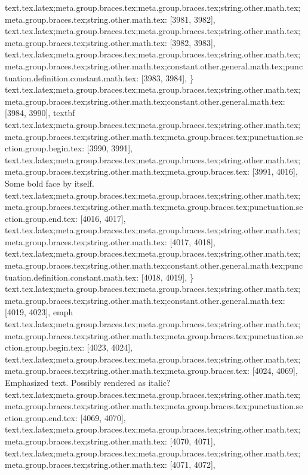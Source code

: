 {{{{{{{{{{{{{{{{{{{{{{{{{{{{{{{{{{{{{{{{{{{{{{{{{{{{{{{{{{{{{{{{{{{{{{{{{{{{{{{{{{{{{{{{{{{{{{{{{{{{{{{{{{{{{{{{{{{{{{{{{{{{{{text.tex.latex;meta.group.braces.tex;meta.group.braces.tex;string.other.math.tex;meta.group.braces.tex;string.other.math.tex: [3981, 3982], {
}
text.tex.latex;meta.group.braces.tex;meta.group.braces.tex;string.other.math.tex;meta.group.braces.tex;string.other.math.tex: [3982, 3983], {
}
text.tex.latex;meta.group.braces.tex;meta.group.braces.tex;string.other.math.tex;meta.group.braces.tex;string.other.math.tex;constant.other.general.math.tex;punctuation.definition.constant.math.tex: [3983, 3984], {\}
text.tex.latex;meta.group.braces.tex;meta.group.braces.tex;string.other.math.tex;meta.group.braces.tex;string.other.math.tex;constant.other.general.math.tex: [3984, 3990], {textbf}
text.tex.latex;meta.group.braces.tex;meta.group.braces.tex;string.other.math.tex;meta.group.braces.tex;string.other.math.tex;meta.group.braces.tex;punctuation.section.group.begin.tex: [3990, 3991], {{}
text.tex.latex;meta.group.braces.tex;meta.group.braces.tex;string.other.math.tex;meta.group.braces.tex;string.other.math.tex;meta.group.braces.tex: [3991, 4016], {Some bold face by itself.}
text.tex.latex;meta.group.braces.tex;meta.group.braces.tex;string.other.math.tex;meta.group.braces.tex;string.other.math.tex;meta.group.braces.tex;punctuation.section.group.end.tex: [4016, 4017], {}}
text.tex.latex;meta.group.braces.tex;meta.group.braces.tex;string.other.math.tex;meta.group.braces.tex;string.other.math.tex: [4017, 4018], {
}
text.tex.latex;meta.group.braces.tex;meta.group.braces.tex;string.other.math.tex;meta.group.braces.tex;string.other.math.tex;constant.other.general.math.tex;punctuation.definition.constant.math.tex: [4018, 4019], {\}
text.tex.latex;meta.group.braces.tex;meta.group.braces.tex;string.other.math.tex;meta.group.braces.tex;string.other.math.tex;constant.other.general.math.tex: [4019, 4023], {emph}
text.tex.latex;meta.group.braces.tex;meta.group.braces.tex;string.other.math.tex;meta.group.braces.tex;string.other.math.tex;meta.group.braces.tex;punctuation.section.group.begin.tex: [4023, 4024], {{}
text.tex.latex;meta.group.braces.tex;meta.group.braces.tex;string.other.math.tex;meta.group.braces.tex;string.other.math.tex;meta.group.braces.tex: [4024, 4069], {Emphasized text. Possibly rendered as italic?}
text.tex.latex;meta.group.braces.tex;meta.group.braces.tex;string.other.math.tex;meta.group.braces.tex;string.other.math.tex;meta.group.braces.tex;punctuation.section.group.end.tex: [4069, 4070], {}}
text.tex.latex;meta.group.braces.tex;meta.group.braces.tex;string.other.math.tex;meta.group.braces.tex;string.other.math.tex: [4070, 4071], {
}
text.tex.latex;meta.group.braces.tex;meta.group.braces.tex;string.other.math.tex;meta.group.braces.tex;string.other.math.tex: [4071, 4072], {
}}}}}}}}}}}}}}}}}}}}}}}}}}}}}}}}}}}}}}}}}}}}}}}}}}}}}}}}}}}}}}}}}}}}}}}}}}}}}}}}}}}}}}}}}}}}}}}}}}}}}}}}}}}}}}}}}}}}}}}}}}}}}}}}}
